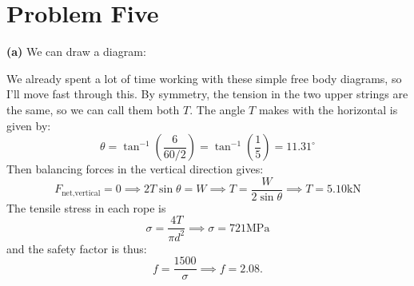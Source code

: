 \documentclass{article}
\begin{document}
\section{Problem Five}
\textbf{(a)} We can draw a diagram:
\begin{center}
\end{center}
We already spent a lot of time working with these simple free body diagrams, so I'll move fast through this. By symmetry, the tension in the two upper strings are the same, so we can call them both $T$. The angle $T$ makes with the horizontal is given by:
\begin{equation}
    \theta = \tan^{-1} \left(\frac{6}{60/2}\right) = \tan^{-1}\left(\frac{1}{5}\right) = 11.31^\circ
    \label{eq:}
\end{equation}
Then balancing forces in the vertical direction gives:
\begin{equation}
    F_\text{net,vertical} = 0 \implies 2T\sin\theta = W \implies T = \frac{W}{2\sin\theta} \implies \boxed{T =5.10 \si{\kilo\newton}}
    \label{eq:tension}
\end{equation}
The tensile stress in each rope is
\begin{equation}
    \sigma = \frac{4T}{\pi d^2} \implies \boxed{\sigma = 721 \si{\mega\pascal}}
\end{equation}
and the safety factor is thus:
\begin{equation}
    f=\frac{1500}{\sigma}\implies \boxed{f = 2.08}.
    \label{eq:}
\end{equation}
\end{document}
